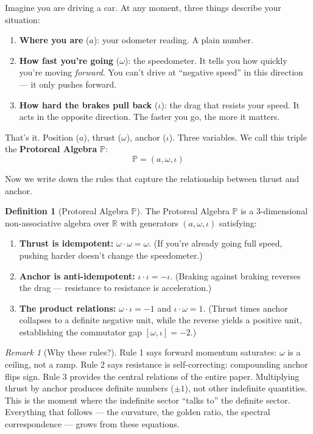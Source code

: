 \documentclass[12pt,oneside]{article}
\theoremstyle{principia}
\theoremstyle{definition}
\newtheorem{definition}[theorem]{Definition}
\theoremstyle{remark}
\newtheorem{remark}[theorem]{Remark}
\providecommand{\PP}{\mathbb{P}}
\providecommand{\RR}{\mathbb{R}}
\begin{document}
Imagine you are driving a car. At any moment, three things describe your situation:
\begin{enumerate}
\item \textbf{Where you are} ($a$): your odometer reading. A plain number.
\item \textbf{How fast you're going} ($\omega$): the speedometer. It tells you how quickly you're moving \emph{forward}. You can't drive at ``negative speed'' in this direction --- it only pushes forward.
\item \textbf{How hard the brakes pull back} ($\iota$): the drag that resists your speed. It acts in the opposite direction. The faster you go, the more it matters.
\end{enumerate}

That's it. Position ($a$), thrust ($\omega$), anchor ($\iota$). Three variables. We call this triple the \textbf{Protoreal Algebra} $\PP$:
$$\PP = (a, \omega, \iota)$$

Now we write down the rules that capture the relationship between thrust and anchor.

\begin{definition}[Protoreal Algebra $\PP$]\label{def:protoreal}
The Protoreal Algebra $\PP$ is a 3-dimensional non-associative algebra over $\RR$ with generators $(a, \omega, \iota)$ satisfying:
\begin{enumerate}
\item \textbf{Thrust is idempotent:} $\omega \cdot \omega = \omega$. (If you're already going full speed, pushing harder doesn't change the speedometer.)
\item \textbf{Anchor is anti-idempotent:} $\iota \cdot \iota = -\iota$. (Braking against braking reverses the drag --- resistance to resistance is acceleration.)
\item \textbf{The product relations:} $\omega \cdot \iota = -1$ and $\iota \cdot \omega = 1$. (Thrust times anchor collapses to a definite negative unit, while the reverse yields a positive unit, establishing the commutator gap $[\omega, \iota] = -2$.)
\end{enumerate}
\end{definition}

\begin{remark}[Why these rules?]
Rule 1 says forward momentum saturates: $\omega$ is a ceiling, not a ramp. Rule 2 says resistance is self-correcting: compounding anchor flips sign. Rule 3 provides the central relations of the entire paper. Multiplying thrust by anchor produces definite numbers ($\pm 1$), not other indefinite quantities. This is the moment where the indefinite sector ``talks to'' the definite sector. Everything that follows --- the curvature, the golden ratio, the spectral correspondence --- grows from these equations.
\end{remark}
\end{document}
